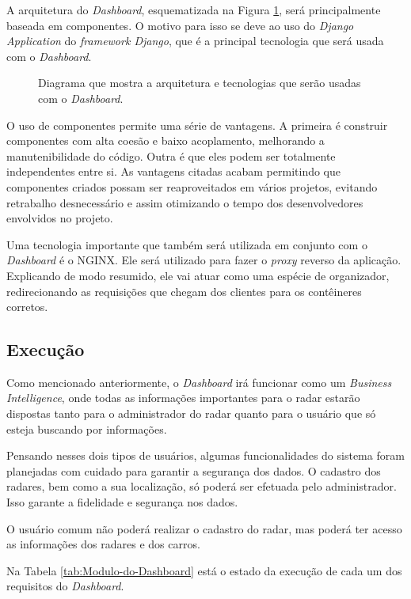 A arquitetura do \textit{Dashboard}, esquematizada na Figura \ref{fig:diagrama-arq-dashboard}, será principalmente baseada em componentes. O motivo para isso se deve ao uso do \textit{Django Application} do \textit{framework Django}, que é a principal tecnologia que será usada com o \textit{Dashboard}.

\begin{figure}[H]
	\caption{\label{fig:diagrama-arq-dashboard} Diagrama que mostra a arquitetura e tecnologias que serão usadas com o \textit{Dashboard}.}
\end{figure}

O uso de componentes permite uma série de vantagens. A primeira é construir componentes com alta coesão e baixo acoplamento, melhorando a manutenibilidade do código. Outra é que eles podem ser totalmente independentes entre si. As vantagens citadas acabam permitindo que componentes criados possam ser reaproveitados em vários projetos, evitando retrabalho desnecessário e assim otimizando o tempo dos desenvolvedores envolvidos no projeto.

Uma tecnologia importante que também será utilizada em conjunto com o \textit{Dashboard} é o NGINX. Ele será utilizado para fazer o \textit{proxy} reverso da aplicação. Explicando de modo resumido, ele vai atuar como uma espécie de organizador, redirecionando as requisições que chegam dos clientes para os contêineres corretos.

\subsection{Execução}

Como mencionado anteriormente, o \textit{Dashboard} irá funcionar como um \textit{Business Intelligence}, onde todas as informações importantes para o radar estarão dispostas tanto para o administrador do radar quanto para o usuário que só esteja buscando por informações.

Pensando nesses dois tipos de usuários, algumas funcionalidades do sistema foram planejadas com cuidado para garantir a segurança dos dados. O cadastro dos radares, bem como a sua localização, só poderá ser efetuada pelo administrador. Isso garante a fidelidade e segurança nos dados.

O usuário comum não poderá realizar o cadastro do radar, mas poderá ter acesso as informações dos radares e dos carros.

Na Tabela \ref{tab:Modulo-do-Dashboard} está o estado da execução de cada um dos requisitos do \textit{Dashboard}.

